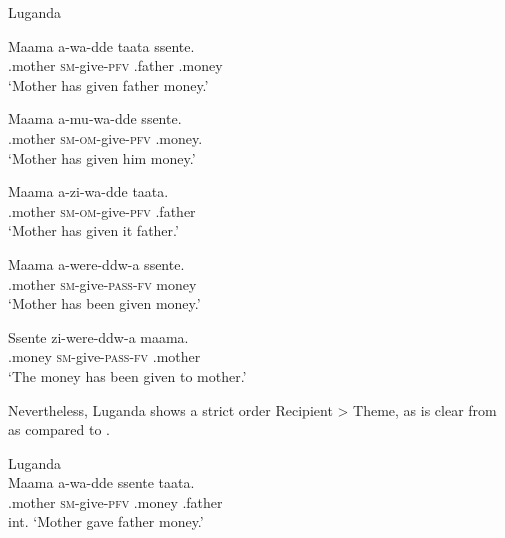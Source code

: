 \documentclass[output=paper]{LSP/langsci}
\begin{document}
\noindent Luganda \citep[67, 72]{Ssekiryango2006}
\ea\label{ex:vanderwal:24}%
     
     \ea\label{ex:vanderwal:24a}
\gll Maama  a-wa-dde  taata  ssente.\\
    .mother  \textsc{sm}{}-give-\textsc{pfv}  .father  .money \\

    \glt ‘Mother has given father money.’

 \ex\label{ex:vanderwal:24b}
\gll Maama  a-mu-wa-dde  ssente. \\
    .mother  \textsc{sm}{}-\textsc{om}{}-give-\textsc{pfv}  .money. \\
    \glt ‘Mother has given him money.’

 \ex\label{ex:vanderwal:24c}
\gll Maama  a-zi-wa-dde  taata.\\
    .mother  \textsc{sm}{}-\textsc{om-}give-\textsc{pfv}  .father\\
    \glt ‘Mother has given it father.’

\z
\z

\ea\label{ex:vanderwal:25}
     \ea\label{ex:vanderwal:25a}
\gll Maama  a-were-ddw-a  ssente. \\
    .mother  \textsc{sm}{}-give-\textsc{pass}{}-\textsc{fv}  money \\
    \glt ‘Mother has been given money.’ 

 \ex\label{ex:vanderwal:25b}
\gll Ssente  zi-were-ddw-a  maama.\\
    .money  \textsc{sm}{}-give-\textsc{pass}{}-\textsc{fv}  .mother \\
    \glt ‘The money has been given to mother.’ 
\z
\z

Nevertheless, Luganda shows a strict order Recipient > Theme, as is clear from  as compared to .


\ea\label{ex:vanderwal:26}%
Luganda \citep[69]{Ssekiryango2006}\\
\gll      * Maama  a-wa-dde  ssente  taata. \\
    {} .mother  \textsc{sm}{}-give-\textsc{pfv}  .money  .father\\
    \glt int. ‘Mother gave father money.’
\z
\end{document}
